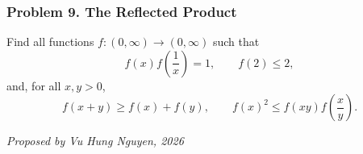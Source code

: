 \subsubsection*{Problem 9. The Reflected Product}

\begin{exercisebox}[medium]

Find all functions $f:(0,\infty)\to(0,\infty)$ such that
\[
f(x)f\left(\frac1x\right)=1,
\qquad f(2)\leq 2,
\]
and, for all $x,y>0$,
\[
f(x+y)\geq f(x)+f(y),
\qquad
f(x)^2\leq f(xy)f\left(\frac{x}{y}\right).
\]

\begin{flushright}
\textit{Proposed by Vu Hung Nguyen, 2026}
\end{flushright}


\end{exercisebox}